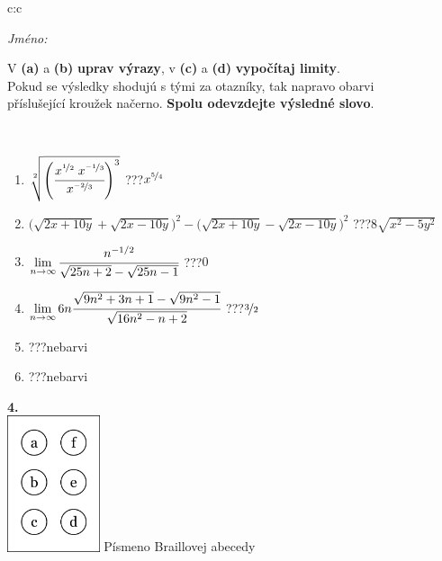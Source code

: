 \documentclass[10pt]{report}
\begin{document}
\begin{tabular}{c:c}
\begin{minipage}[c][104.5mm][t]{0.5\linewidth}
\begin{center}
\textit{Jméno:}\phantom{xxxxxxxxxxxxxxxxxxxxxxxxxxxxxxxxxxxxxxxxxxxxxxxxxxxxxxxxxxxxxxxxx}\\[5mm]
\begin{minipage}{0.95\linewidth}
\begin{center}
V \textbf{(a)} a \textbf{(b)} \textbf{uprav výrazy}, v \textbf{(c)} a \textbf{(d)} \textbf{vypočítaj limity}.\\Pokud se výsledky shodujú s tými za otazníky, tak napravo obarvi\\příslušející kroužek načerno. \textbf{Spolu odevzdejte výsledné slovo}.
\end{center}
\end{minipage}
\\[1mm]
\begin{minipage}{0.79\linewidth}
\begin{center}
\begin{varwidth}{\linewidth}
\begin{enumerate}
\small
\item $\sqrt[2]{\left(\cfrac{x^{\nicefrac{1}{2}}\;x^{\nicefrac{-1}{3}}}{x^{\nicefrac{-2}{3}}}\right)^{3}}$\quad \dotfill\; ???\;\dotfill \quad $x^{\nicefrac{5}{4}}$
\item {\footnotesize{\scriptsize$\big(\sqrt{2x+10y}+\sqrt{2x-10y}\big)^2-\big(\sqrt{2x+10y}-\sqrt{2x-10y}\big)^2$}\quad \dotfill\; ???\;\dotfill \quad $8\sqrt{x^2-5y^2}$}
\item $\lim\limits_{n\to\infty}\cfrac{n^{-1/2}}{\sqrt{25n+2}-\sqrt{25n-1}}$\quad \dotfill\; ???\;\dotfill \quad $0$
\item $\lim\limits_{n\to\infty}6n\cfrac{\sqrt{9n^2+3n+1}-\sqrt{9n^2-1}}{\sqrt{16n^2-n+2}}$\quad \dotfill\; ???\;\dotfill \quad $\nicefrac{3}{2}$
\item \quad \dotfill\; ???\;\dotfill \quad nebarvi
\item \quad \dotfill\; ???\;\dotfill \quad nebarvi
\end{enumerate}
\end{varwidth}
\end{center}
\end{minipage}
\begin{minipage}{0.20\linewidth}
\begin{center}
{\Huge\bfseries 4.} \\[2mm]
\includegraphics[height=40mm]{../images/braille.png}
{\small Písmeno Braillovej abecedy}
\end{center}
\end{minipage}
\end{center}
\end{minipage}
%
\end{tabular}
\end{document}
